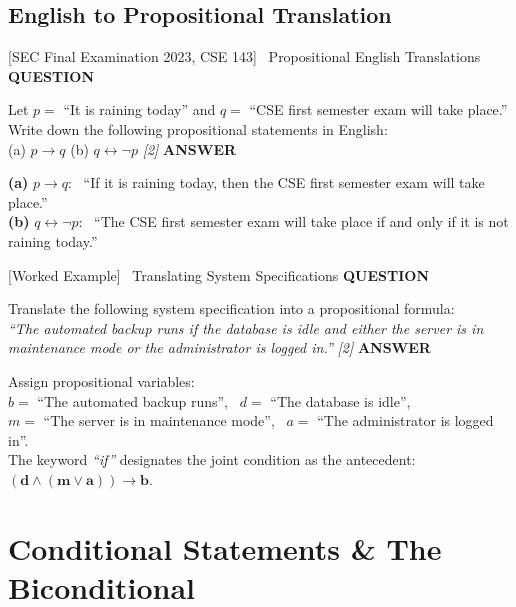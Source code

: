 \documentclass[11pt,a4paper]{article}
\newcommand{\Qlabel}{\textbf{\color{navy}\footnotesize\MakeUppercase{Question}}\par\smallskip}
\newcommand{\Alabel}{\textbf{\color{teal}\footnotesize\MakeUppercase{Answer}}\par\smallskip}
\begin{document}
\subsection{English to Propositional Translation}
\begin{exambox}{[SEC Final Examination 2023, CSE 143] \ Propositional English Translations}
\Qlabel
Let $p =$ ``It is raining today'' and $q =$ ``CSE first semester exam will take place.''\\
Write down the following propositional statements in English:\\
(a) $p \rightarrow q$ \quad (b) $q \leftrightarrow \neg p$ \hfill\textit{[2]}
\tcblower
\Alabel
\textbf{(a)} $p \rightarrow q$: \ ``If it is raining today, then the CSE first semester exam will take place.''\\
\textbf{(b)} $q \leftrightarrow \neg p$: \ ``The CSE first semester exam will take place if and only if it is not raining today.''
\end{exambox}

\begin{exambox}{[Worked Example] \ Translating System Specifications}
\Qlabel
Translate the following system specification into a propositional formula:\\
\textit{``The automated backup runs if the database is idle and either the server is in maintenance mode or the administrator is logged in.''} \hfill\textit{[2]}
\tcblower
\Alabel
Assign propositional variables:\\
$b =$ ``The automated backup runs'', \ $d =$ ``The database is idle'',\\
$m =$ ``The server is in maintenance mode'', \ $a =$ ``The administrator is logged in''.\\
The keyword \textit{``if''} designates the joint condition as the antecedent: \ $\mathbf{(d \wedge (m \vee a)) \rightarrow b}$.
\end{exambox}

\newpage

\section{Conditional Statements \& The Biconditional}
\end{document}
